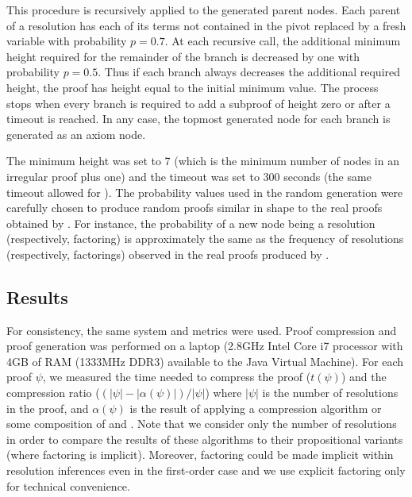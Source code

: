 {This procedure is recursively applied to the generated parent nodes. 
Each parent of a resolution has each of its terms not contained in the pivot replaced by a fresh variable with probability $p=0.7$.
At each recursive call, the additional minimum height required for the remainder of the branch is decreased by one with probability $p=0.5$. Thus if each branch always decreases the additional required height, the proof has height equal to the initial minimum value. The process stops when every branch is required to add a subproof of height zero or after a timeout is reached. In any case, the topmost generated node for each branch is generated as an axiom node. 

The minimum height was set to 7 (which is the minimum number of nodes in an irregular proof plus one) and the timeout was set to 300 seconds (the same timeout allowed for {\SPASS}). The probability values used in the random generation were carefully chosen to produce random proofs similar in shape to the real proofs obtained by {\SPASS}. For instance, the probability of a new node being a resolution (respectively, factoring) is approximately the same as the frequency of resolutions (respectively, factorings) observed in the real proofs produced by {\SPASS}.


\subsection{Results}
For consistency, the same system and metrics were used. Proof compression and proof generation was performed on a laptop (2.8GHz Intel Core i7 processor with 4GB of RAM (1333MHz DDR3) available to the Java Virtual Machine). For each proof $\psi$, we measured the time needed to compress the proof ($t(\psi)$) and the compression ratio ($(|\psi|-|\alpha(\psi)|)/|\psi|$) where $|\psi|$ is the number of resolutions in the proof, and $\alpha(\psi)$ is the result of applying a compression algorithm or some composition of {\FORPI} and {\GFOLU}. Note that we consider only the number of resolutions in order to compare the results of these algorithms to their propositional variants (where factoring is implicit). Moreover, factoring could be made implicit within resolution inferences even in the first-order case and we use explicit factoring only for technical convenience.




}

